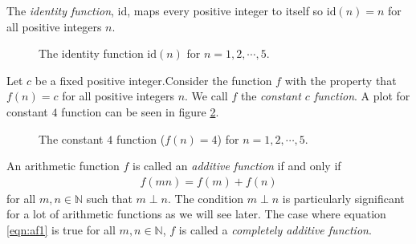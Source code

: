 \documentclass[12pt]{subfile}
\begin{document}
		\begin{definition}
			The \textit{identity function}, $\text{id}$, maps every positive integer to itself so $\text{id}(n)=n$ for all positive integers $n$. %
			\begin{figure}
				\centering
				\caption{The identity function $\text{id}(n)$ for $n=1,2,\cdots,5$.}
				\label{fig:identityfunction}
			\end{figure}
		\end{definition}

		\begin{definition}
			Let $c$ be a fixed positive integer.Consider the function $f$ with the property that $f(n)=c$ for all positive integers $n$. We call $f$ the \textit{constant $c$ function}. A plot for constant $4$ function can be seen in figure \ref{fig:constantfunction}.

			\begin{figure}
				\centering
				\caption{The constant $4$ function ($f(n)=4$) for $n=1,2,\cdots,5$.}
				\label{fig:constantfunction}
			\end{figure}
		\end{definition}
		\begin{definition}
			An arithmetic function $f$ is called an \textit{additive function} if and only if
				\begin{align}
					f(mn)=f(m)+f(n)\label{eqn:af1}
				\end{align}
			for all $m,n\in\mathbb{N}$ such that $m\perp n$. The condition $m\perp n$ is particularly significant for a lot of arithmetic functions as we will see later. The case where equation \ref{eqn:af1} is true for all $m,n\in\mathbb{N}$, $f$ is called a \textit{completely additive function}.
		\end{definition}
\end{document}
